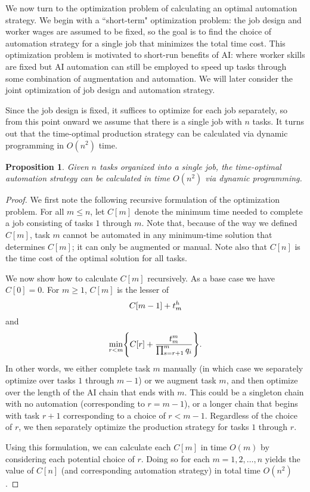 \documentclass{article}
\theoremstyle{plain}
\theoremstyle{plain}
\newtheorem{proposition}{Proposition}
\begin{document}
We now turn to the optimization problem of calculating an optimal automation strategy.  We begin with a ``short-term" optimization problem: the job design and worker wages are assumed to be fixed, so the goal is to find the choice of automation strategy for a single job that minimizes the total time cost.  This optimization problem is motivated to short-run benefits of AI: where worker skills are fixed but AI automation can still be employed to speed up tasks through some combination of augmentation and automation.  We will later consider the joint optimization of job design and automation strategy.

Since the job design is fixed, it suffices to optimize for each job separately, so from this point onward we assume that there is a single job with $n$ tasks.  It turns out that the time-optimal production strategy can be calculated via dynamic programming in $O(n^2)$ time.

\begin{proposition}
Given $n$ tasks organized into a single job, the time-optimal automation strategy can be calculated in time $O(n^2)$ via dynamic programming.    
\end{proposition}
\begin{proof}
    We first note the following recursive formulation of the optimization problem. For all $m \leq n$, let $C[m]$ denote the minimum time needed to complete a job consisting of tasks $1$ through $m$.  Note that, because of the way we defined $C[m]$, task $m$ cannot be automated in any minimum-time solution that determines $C[m]$; it can only be augmented or manual.  Note also that $C[n]$ is the time cost of the optimal solution for all tasks.
    
    We now show how to calculate $C[m]$ recursively.  As a base case we have $C[0] = 0$.  For $m \geq 1$, $C[m]$ is the lesser of
    \[ C[m-1] + t^{h}_{m} \]
    and
    \[ \min_{r < m} \Biggl\{ C[r] + \frac{t^{m}_{m}}{\prod_{s=r+1}^m q_i} \Biggr\}.
    \]
    In other words, we either complete task $m$ manually (in which case we separately optimize over tasks $1$ through $m-1$) or we augment task $m$, and then optimize over the length of the AI chain that ends with $m$.  This could be a singleton chain with no automation (corresponding to $r = m-1$), or a longer chain that begins with task $r+1$ corresponding to a choice of $r < m-1$.  Regardless of the choice of $r$, we then separately optimize the production strategy for tasks $1$ through $r$.
    
    Using this formulation, we can calculate each $C[m]$ in time $O(m)$ by considering each potential choice of $r$.  Doing so for each $m = 1, 2, \dotsc, n$ yields the value of $C[n]$ (and corresponding automation strategy) in total time $O(n^2)$.
\end{proof}
\end{document}
